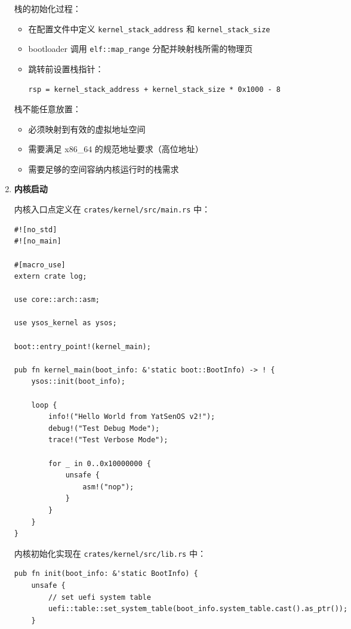 \documentclass{SYSUReport}
\begin{document}
\begin{enumerate}[label={\chinese*、},labelsep=0pt, start=2]
    栈的初始化过程：
    \begin{itemize}
        \item 在配置文件中定义 \texttt{kernel\_stack\_address} 和 \texttt{kernel\_stack\_size}
        \item bootloader 调用 \texttt{elf::map\_range} 分配并映射栈所需的物理页
        \item 跳转前设置栈指针：
        \begin{verbatim}
rsp = kernel_stack_address + kernel_stack_size * 0x1000 - 8
        \end{verbatim}
    \end{itemize}

    栈不能任意放置：
    \begin{itemize}
        \item 必须映射到有效的虚拟地址空间
        \item 需要满足 x86\_64 的规范地址要求（高位地址）
        \item 需要足够的空间容纳内核运行时的栈需求
    \end{itemize}

    \item \textbf{内核启动}

    内核入口点定义在 \texttt{crates/kernel/src/main.rs} 中：

    \begin{verbatim}
#![no_std]
#![no_main]

#[macro_use]
extern crate log;

use core::arch::asm;

use ysos_kernel as ysos;

boot::entry_point!(kernel_main);

pub fn kernel_main(boot_info: &'static boot::BootInfo) -> ! {
    ysos::init(boot_info);

    loop {
        info!("Hello World from YatSenOS v2!");
        debug!("Test Debug Mode");
        trace!("Test Verbose Mode");

        for _ in 0..0x10000000 {
            unsafe {
                asm!("nop");
            }
        }
    }
}
    \end{verbatim}

    内核初始化实现在 \texttt{crates/kernel/src/lib.rs} 中：

    \begin{verbatim}
pub fn init(boot_info: &'static BootInfo) {
    unsafe {
        // set uefi system table
        uefi::table::set_system_table(boot_info.system_table.cast().as_ptr());
    }


\end{verbatim}
\end{enumerate}
\end{document}
